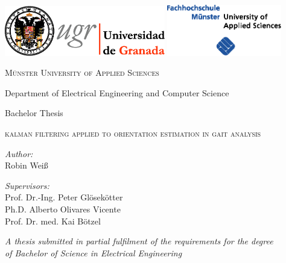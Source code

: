 \begin{titlepage}
\label{ch:titlepage}

\begin{center}

\includegraphics[width=7cm]{images/universidad_de_granada.eps}
	\hfill
\includegraphics[width=5cm]{images/fh-muenster.eps} 

\vspace{2.5cm}

{\large \textsc{Münster University of Applied Sciences}}

Department of Electrical Engineering and Computer Science

\vspace{1.5cm}

{\large Bachelor Thesis}

\vspace{0.8cm}

\begin{LARGE}
\textsc{kalman filtering applied to orientation estimation in gait analysis}
\end{LARGE}

\vspace{1.8cm}

\begin{minipage}{0.4\textwidth}
\begin{flushleft}
\emph{Author:} \\
Robin Weiß
\end{flushleft}
\end{minipage}
\hfill
\begin{minipage}{0.5\textwidth}
\begin{flushright}
\emph{Supervisors:} \\
Prof. Dr.-Ing. Peter Glösekötter \\
Ph.D. Alberto Olivares Vicente \\
Prof. Dr. med. Kai Bötzel
\end{flushright}
\end{minipage}

\vspace{2.0cm}
	
\textit{A thesis submitted in partial fulfilment of the requirements for the degree\\
of Bachelor of Science in Electrical Engineering}

\vfill

\monthname \: \the\year 

\end{center}

\end{titlepage}
